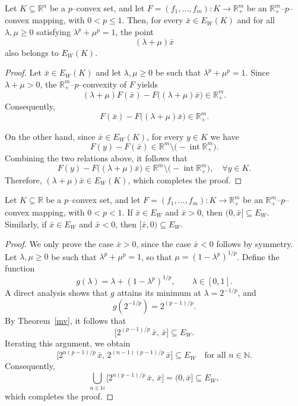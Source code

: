 \documentclass[10pt]{article}
\begin{document}
\begin{theorem}
Let $K \subseteq \mathbb{R}^n$ be a $p$--convex set, and let
$F=(f_1,\ldots,f_m):K \to \mathbb{R}^m_{+}$ be an
$\mathbb{R}^m_{+}$--$p$--convex mapping, with $0<p\le 1$.
Then, for every $\bar{x}\in E_W(K)$ and for all $\lambda,\mu \ge 0$
satisfying $\lambda^{p}+\mu^{p}=1$, the point
\[
(\lambda+\mu)\bar{x}
\]
also belongs to $E_W(K)$.
\label{mv}
\end{theorem}
\begin{proof}
Let $\bar{x}\in E_W(K)$ and let $\lambda,\mu \ge 0$ be such that
$\lambda^{p}+\mu^{p}=1$.
Since $\lambda+\mu>0$, the $\mathbb{R}^m_{+}$--$p$--convexity of $F$ yields
\[
(\lambda+\mu)F(\bar{x}) - F\big((\lambda+\mu)\bar{x}\big)
\in \mathbb{R}^m_{+}.
\]
Consequently,
\[
F(\bar{x}) - F\big((\lambda+\mu)\bar{x}\big)
\in \mathbb{R}^m_{+}.
\]

On the other hand, since $\bar{x}\in E_W(K)$, for every $y\in K$ we have
\[
F(y)-F(\bar{x}) \in \mathbb{R}^m \setminus
\big(-\operatorname{int}\mathbb{R}^m_{+}\big).
\]
Combining the two relations above, it follows that
\[
F(y)-F\big((\lambda+\mu)\bar{x}\big)
\in \mathbb{R}^m \setminus
\big(-\operatorname{int}\mathbb{R}^m_{+}\big),
\quad \forall y\in K.
\]
Therefore, $(\lambda+\mu)\bar{x} \in E_W(K)$, which completes the proof.
\end{proof}


 \begin{corollary}
Let $K \subseteq \mathbb{R}$ be a $p$--convex set, and let
$F=(f_{1},\ldots,f_{m}):K \to \mathbb{R}^{m}_{+}$ be an
$\mathbb{R}^{m}_{+}$--$p$--convex mapping, with $0<p<1$.
If $\bar{x} \in E_W$ and $\bar{x}>0$, then $(0,\bar{x}] \subseteq E_W$.
Similarly, if $\bar{x} \in E_W$ and $\bar{x}<0$, then
$[\bar{x},0) \subseteq E_W$.
\label{Caract Ew}
\end{corollary}
\begin{proof}
We only prove the case $\bar{x}>0$, since the case $\bar{x}<0$ follows by symmetry.
Let $\lambda,\mu \ge 0$ be such that $\lambda^{p}+\mu^{p}=1$, so that
$\mu=(1-\lambda^{p})^{1/p}$.
Define the function
\[
g(\lambda)=\lambda+(1-\lambda^{p})^{1/p}, \qquad \lambda \in [0,1].
\]
A direct analysis shows that $g$ attains its minimum at
$\lambda=2^{-1/p}$, and
\[
g\!\left(2^{-1/p}\right)=2^{(p-1)/p}.
\]
By Theorem~\ref{mv}, it follows that
\[
\bigl[2^{(p-1)/p}\,\bar{x},\,\bar{x}\bigr] \subseteq E_W.
\]
Iterating this argument, we obtain
\[
\bigl[2^{n(p-1)/p}\,\bar{x},\,2^{(n-1)(p-1)/p}\,\bar{x}\bigr]
\subseteq E_W
\quad \text{for all } n \in \mathbb{N}.
\]
Consequently,
\[
\bigcup_{n \in \mathbb{N}}
\bigl[2^{n(p-1)/p}\,\bar{x},\,\bar{x}\bigr]
= (0,\bar{x}] \subseteq E_W,
\]
which completes the proof.
\end{proof}
\end{document}

